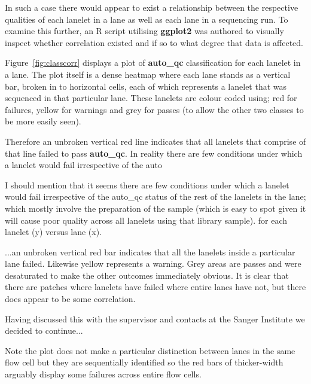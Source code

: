 In such a case there would appear to exist a relationship between the respective
qualities of each lanelet in a lane as well as each lane in a sequencing run. To
examine this further, an R script utilising \textbf{ggplot2} was authored to
visually inspect whether correlation existed and if so to what degree that data
is affected.

Figure~\ref{fig:classcorr} displays a plot of \textbf{auto\_qc} classification
for each lanelet in a lane. The plot itself is a dense heatmap
where each lane stands as a vertical bar, broken in to horizontal cells, each
of which represents a lanelet that was sequenced in that particular lane. These
lanelets are colour coded using; red for failures, yellow for warnings and grey
for passes (to allow the other two classes to be more easily seen).

Therefore an unbroken vertical red line indicates that all lanelets that
comprise of that line failed to pass \textbf{auto\_qc}. In reality there are few
conditions under which a lanelet would fail irrespective of the auto


 I should mention that it seems there are
few conditions under which a lanelet would fail irrespective of the auto\_qc
status of the rest of the lanelets in the lane; which mostly involve the
preparation of the sample (which is easy to spot given it will cause poor
quality across all lanelets using that library sample).
for each lanelet (y) versus lane (x).

...an unbroken vertical red bar indicates that all the lanelets inside a
particular lane failed. Likewise yellow represents a warning. Grey areas are
passes and were desaturated to make the other outcomes immediately obvious. It
is clear that there are patches where lanelets have failed where entire lanes
have not, but there does appear to be some correlation.

Having discussed this with the supervisor and contacts at the Sanger Institute
we decided to continue...

Note the plot does not make a particular distinction between lanes in the same
flow cell but they are sequentially identified so the red bars of thicker-width
arguably display some failures across entire flow cells.

